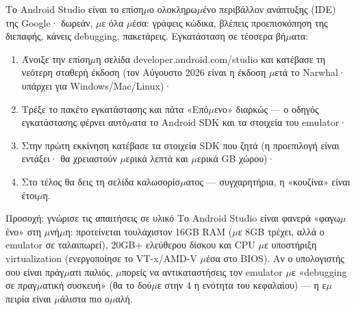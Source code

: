 


Το Android Studio είναι το επίση$\mu$ο ολοκληρω$\mu$ένο περιβάλλον ανάπτυξης (IDE) της Google· δωρεάν, $\mu$ε όλα $\mu$έσα: γράφεις κώδικα, βλέπεις προεπισκόπηση της διεπαφής, κάνεις debugging, πακετάρεις. Εγκατάσταση σε τέσσερα βή$\mu$ατα:

\begin{enumerate}
  \item Άνοιξε την επίση$\mu$η σελίδα developer.android.com/studio και κατέβασε τη νεότερη σταθερή έκδοση (τον Αύγουστο 2026 είναι η έκδοση $\mu$ετά το Narwhal· υπάρχει για Windows/Mac/Linux)·
  \item Τρέξε το πακέτο εγκατάστασης και πάτα «Επό$\mu$ενο» διαρκώς — ο οδηγός εγκατάστασης φέρνει αυτό$\mu$ατα το Android SDK και τα στοιχεία του emulator·
  \item Στην πρώτη εκκίνηση κατέβασε τα στοιχεία SDK που ζητά (η προεπιλογή είναι εντάξει· θα χρειαστούν $\mu$ερικά λεπτά και $\mu$ερικά GB χώρου)·
  \item Στο τέλος θα δεις τη σελίδα καλωσορίσ$\mu$ατος — συγχαρητήρια, η «κουζίνα» είναι έτοι$\mu$η.
\end{enumerate}

\begin{tcbwarn}{Προσοχή: γνώρισε τις απαιτήσεις σε υλικό}
Το Android Studio είναι φανερά «φαγω$\mu$ένο» στη $\mu$νή$\mu$η: προτείνεται τουλάχιστον 16GB RAM ($\mu$ε 8GB τρέχει, αλλά ο emulator σε ταλαιπωρεί), 20GB+ ελεύθερου δίσκου και CPU $\mu$ε υποστήριξη virtualization (ενεργοποίησε το VT-x/AMD-V $\mu$έσα στο BIOS). Αν ο υπολογιστής σου είναι πράγ$\mu$ατι παλιός, $\mu$πορείς να αντικαταστήσεις τον emulator $\mu$ε «debugging σε πραγ$\mu$ατική συσκευή» (θα το δού$\mu$ε στην 4 η ενότητα του κεφαλαίου) — η ε$\mu$πειρία είναι $\mu$άλιστα πιο ο$\mu$αλή.

\end{tcbwarn}

